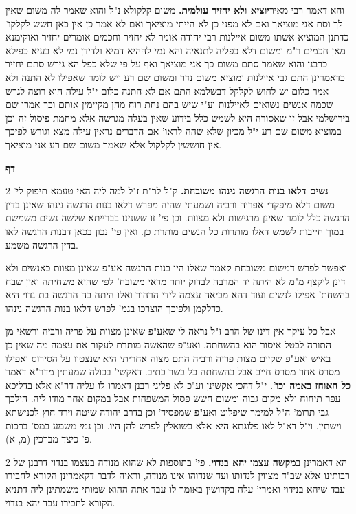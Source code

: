 \documentclass[12pt, openany]{book}
\newcommand{\sethebfont}{
\fontsize{10.5pt}{21.0pt} \selectfont
}
\newcommand{\twocol}[1]{
	{\sethebfont \begin{multicols}{2}
			#1
	\end{multicols}}	
}
\newcommand{\chapname}{}
\newcommand{\newchap}[1]{
	\addcontentsline{toc}{chapter}{#1}
	\renewcommand{\chapname}{#1}
		\begin{center}
			\textbf{%
\fontsize{16pt}{16pt}\selectfont
				#1}
		\end{center}
}
\begin{document}
{\par והא דאמר רבי מאיר\textbf{יוציא ולא יחזיר עולמית.}  משום קלקולא נ"ל והוא שאמר לה משום שאין לך וסת אני מוציאך ואם לא מפני כן לא הייתי מוציאך ואם לא אמר כן אין כאן חשש לקלקו' כדתנן המוציא אשתו משום איילנות רבי יהודה אומר לא יחזיר וחכמים אומרים יחזיר ואוקימנא מאן חכמים ר"מ ומשום דלא כפליה לתנאיה והא נמי לההיא דמיא ולדידן נמי לא בעיא כפילא כרבנן והוא שאמר סתם משום כך אני מוציאך ואף על פי שלא כפל הא גירש סתם יחזיר כדאמרינן התם גבי איילנות ומוציא משום נדר ומשום שם רע ויש לומר שאפילו לא התנה ולא אמר כלום יש לחוש לקלקל דבשלמא התם אם לא התנה כלום י"ל עילה הוא רוצה לגרש שכמה אנשים נשואים לאיילנות וע"י שיש בהם נחת רוח מהן מקיימין אותם וכך אמרו שם בירושלמי אבל זו שאסורה היא לשמש כלל בידוע שאין בעלה מגרשה אלא מחמת פיסול זה וכן במוציא משום שם רע י"ל מכיון שלא שהה לראו' אם הדברים נראין עילה מצא וגורש לפיכך אין חוששין לקלקול אלא שאמר משום שם רע אני מוציאך. 
\par}
\newchap{דף }
\twocol{\textbf{נשים דלאו בנות הרגשה נינהו משובחת.}  ק"ל לר"ת ז"ל למה ליה האי טעמא תיפוק לי' משום דלא מיפקדי אפריה ורביה ושמעתי שהיה מפרש דלאו בנות הרגשה נינהו שאינן בדין הרגשה כלל לומר שאינן מרגישות ולא מצוות. וכן פי' זו ששנינו בברייתא שלשה נשים משמשת במוך חייבות לשמש דאלו מותרות כל הנשים מותרת כן. ואין פי' נכון בכאן דבנות הרגשה לאו בדין הרגשה משמע.\par ואפשר לפרש דמשום משובחת קאמר שאלו היו בנות הרגשה אע"פ שאינן מצוות כאנשים ולא דינן ליקצף מ"מ לא היתה יד המרבה לבדוק יותר מדאי משובח' לפי שהיא משחיתה ואין שבח בהשחת' אפילו לנשים ועוד דהא מביאה עצמה לידי הרהור ואלו היתה בה הרגשה בת נדוי היא כדלקמן ולפיכך הוצרכו בגמ' לפרש דלאו בנות הרגשה נינהו.\par אבל כל עיקר אין דינו של הרב ז"ל נראה לי שאע"פ שאינן מצוות על פריה ורביה ורשאי מן התורה לבטל איסור הוא בהשחתה. ואע"פ שהאשה מותרת לעקור את עצמה מה שאין כן באיש ואע"פ שקיים מצות פריה ורביה התם מצוה אחריתי היא שנצטוו על הסירוס ואפילו מסרס אחר מסרס חייב אבל בהשחתה כל בשר כתיב. 
\parהא דאקשי' בכולה שמעתין מדר"א דאמר \textbf{כל האוחז באמה וכו'.}  י"ל דהכי אקשינן וע"כ לא פליגי רבנן דאמרו לו עליה דר"א אלא בדליכא עפר תיחוח ולא מקום גבוה ומשום חשש פסול המשפחות אבל במקום אחר מודו ליה. הילכך גבי תרומ' ה"ל למימר שיפלוט ואע"פ שמפסיד' וכן בדרב יהודה שיטה וירד חוץ לכנישתא וישתין. וי"ל דא"ל לאו פלוגתא היא אלא בשואלין לפרש להן היו. וכן נמי משמע במס' ברכות פ' כיצד מברכין (מ, א). 
\par}
\twocol{הא דאמרינן ב\textbf{מקשה עצמו יהא בנדוי.}  פי' בתוספות לא שהוא מנודה בעצמו בנדוי דרבנן של רבותינו אלא שב"ד מצווין לנדותו ועד שנדוהו אינו מנודה, וראיה לדבר דקאמרינן הקורא לחבירו עבד שיהא בנידוי ואמרי' עלה בקדושין באומר לו עבד אתה ההוא שמותי משמתינן ליה דתניא הקורא לחבירו עבד יהא בנדוי. 
\par}
\end{document}
